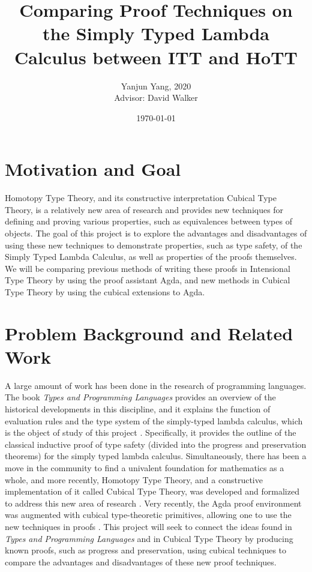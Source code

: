\documentclass[10pt, letterpaper]{article}
\title{Comparing Proof Techniques on the Simply Typed Lambda Calculus between ITT and HoTT}
\author{Yanjun Yang, 2020\\Advisor: David Walker}
\date{\today}
\begin{document}
\maketitle


\section{Motivation and Goal}
\begin{flushleft}
Homotopy Type Theory, and its constructive interpretation Cubical Type Theory, is a relatively new area of research and provides new techniques for defining and proving various properties, such as equivalences between types of objects. The goal of this project is to explore the advantages and disadvantages of using these new techniques to demonstrate properties, such as type safety, of the Simply Typed Lambda Calculus, as well as properties of the proofs themselves. We will be comparing previous methods of writing these proofs in Intensional Type Theory by using the proof assistant Agda, and new methods in Cubical Type Theory by using the cubical extensions to Agda.
\end{flushleft}

\section{Problem Background and Related Work}
\begin{flushleft}
A large amount of work has been done in the research of programming languages. The book \textit{Types and Programming Languages} provides an overview of the historical developments in this discipline, and it explains the function of evaluation rules and the type system of the simply-typed lambda calculus, which is the object of study of this project \cite{tatl}. Specifically, it provides the outline of the classical inductive proof of type safety (divided into the progress and preservation theorems) for the simply typed lambda calculus. Simultaneously, there has been a move in the community to find a univalent foundation for mathematics as a whole, and more recently, Homotopy Type Theory, and a constructive implementation of it called Cubical Type Theory, was developed and formalized to address this new area of research \cite{hottbook, cchm, cartesiancubical1, cartesiancubical2, cubicalmodel}. Very recently, the Agda proof environment was augmented with cubical type-theoretic primitives, allowing one to use the new techniques in proofs \cite{cubicalagda}. This project will seek to connect the ideas found in \textit{Types and Programming Languages} and in Cubical Type Theory by producing known proofs, such as progress and preservation, using cubical techniques to compare the advantages and disadvantages of these new proof techniques.
\end{flushleft}
\end{document}
